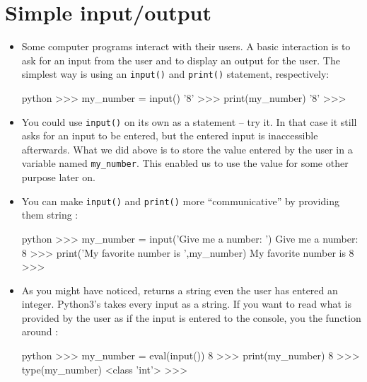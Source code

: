 \documentclass[a4paper]{article}
\begin{document}
\section{Simple input/output}

\begin{itemize}

\item Some computer programs interact with their users. A basic interaction is
to ask for an input from the user and to display an output for the user. The
simplest way is using an \Verb+input()+ and \Verb+print()+ statement,
respectively:

\begin{ucodeframe}
\begin{pygments}[frame=none]{python}
>>> my_number = input()
'8'
>>> print(my_number)
'8'
>>> 
\end{pygments}
\end{ucodeframe}

\item You could use \Verb+input()+ on its own as a statement -- try it. In that
case it still asks for an input to be entered, but the entered input is
inaccessible afterwards. What we did above is to store the value entered by the
user in a variable named \Verb+my_number+. This enabled us to use the value for
some other purpose later on.

\item You can make \Verb+input()+ and \Verb+print()+ more ``communicative'' by
providing them string :

\begin{ucodeframe}
\begin{pygments}[frame=none]{python}
>>> my_number = input('Give me a number: ')
Give me a number: 8
>>> print('My favorite number is ',my_number)
My favorite number is  8
>>> 
\end{pygments}
\end{ucodeframe}


\item As you might have noticed,  returns a string even the user has
entered an integer. Python3's  takes every input as a string. If you
want  to read what is provided by the user as if the input is entered
to the console, you  the function  around :

\begin{ucodeframe}
\begin{pygments}[frame=none]{python}
>>> my_number = eval(input())
8
>>> print(my_number)
8
>>> type(my_number)
<class 'int'>
>>> 
\end{pygments}
\end{ucodeframe}
\end{itemize}
\end{document}
